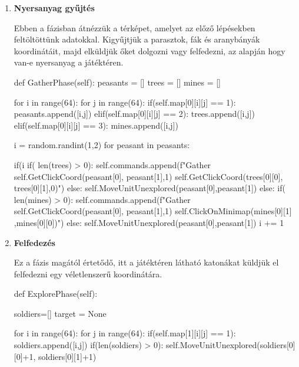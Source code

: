 \begin{enumerate}
    \item \textbf{Nyersanyag gyűjtés}

    Ebben a fázisban átnézzük a térképet, amelyet az előző lépésekben feltöltöttünk adatokkal. Kigyűjtjük a parasztok, fák és aranybányák koordinátáit, majd elküldjük őket dolgozni vagy felfedezni, az alapján hogy van-e nyersanyag a játéktéren.

    \begin{python}
        
def GatherPhase(self):
    peasants = []
    trees = []
    mines = []

    for i in range(64):
        for j in range(64):
            if(self.map[0][i][j] == 1):
                peasants.append([i,j])
            elif(self.map[0][i][j] == 2):
                trees.append([i,j])
            elif(self.map[0][i][j] == 3):
                mines.append([i,j])

    i = random.randint(1,2)
    for peasant in peasants:
            
        if(i %
            if( len(trees) > 0):
                self.commands.append(f"Gather 
                {self.GetClickCoord(peasant[0],
                peasant[1],1)} { self.GetClickCoord(trees[0][0],
                trees[0][1],0)}")
            else:
                self.MoveUnitUnexplored(peasant[0],peasant[1])
        else:
            if( len(mines) > 0):
                self.commands.append(f"Gather 
                {self.GetClickCoord(peasant[0],
                peasant[1],1)} { self.ClickOnMinimap(mines[0][1]
                ,mines[0][0])}")
            else:
                self.MoveUnitUnexplored(peasant[0],peasant[1])
        i += 1
\end{python}

\item \textbf{Felfedezés}

Ez a fázis magától értetődő, itt a játéktéren látható katonákat küldjük el felfedezni egy véletlenszerű koordinátára.
 \begin{python}
def ExplorePhase(self):

    soldiers=[]
    target = None
        
    for i in range(64):
        for j in range(64):
            if(self.map[1][i][j] == 1):
                soldiers.append([i,j])
    if(len(soldiers) > 0):
        self.MoveUnitUnexplored(soldiers[0][0]+1,
        soldiers[0][1]+1)
    \end{python}


\end{enumerate}
